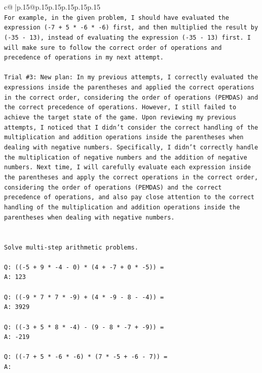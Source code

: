 \documentclass{article}
\begin{document}
{\begin{supertabular}{c@{$\;$}|p{.15\linewidth}@{}p{.15\linewidth}p{.15\linewidth}p{.15\linewidth}p{.15\linewidth}p{.15\linewidth}}
{{{\\ 
\texttt{For example, in the given problem, I should have evaluated the expression ({-}7 + 5 * {-}6 * {-}6) first, and then multiplied the result by ({-}35 {-} 13), instead of evaluating the expression ({-}35 {-} 13) first. I will make sure to follow the correct order of operations and precedence of operations in my next attempt.} \\
\\ 
\texttt{Trial \#3: New plan: In my previous attempts, I correctly evaluated the expressions inside the parentheses and applied the correct operations in the correct order, considering the order of operations (PEMDAS) and the correct precedence of operations. However, I still failed to achieve the target state of the game. Upon reviewing my previous attempts, I noticed that I didn't consider the correct handling of the multiplication and addition operations inside the parentheses when dealing with negative numbers. Specifically, I didn't correctly handle the multiplication of negative numbers and the addition of negative numbers. Next time, I will carefully evaluate each expression inside the parentheses and apply the correct operations in the correct order, considering the order of operations (PEMDAS) and the correct precedence of operations, and also pay close attention to the correct handling of the multiplication and addition operations inside the parentheses when dealing with negative numbers.} \\
\\ 
\\ 
\texttt{Solve multi{-}step arithmetic problems.} \\
\\ 
\texttt{Q: (({-}5 + 9 * {-}4 {-} 0) * (4 + {-}7 + 0 * {-}5)) =} \\
\texttt{A: 123} \\
\\ 
\texttt{Q: (({-}9 * 7 * 7 * {-}9) + (4 * {-}9 {-} 8 {-} {-}4)) =} \\
\texttt{A: 3929} \\
\\ 
\texttt{Q: (({-}3 + 5 * 8 * {-}4) {-} (9 {-} 8 * {-}7 + {-}9)) =} \\
\texttt{A: {-}219} \\
\\ 
\texttt{Q: (({-}7 + 5 * {-}6 * {-}6) * (7 * {-}5 + {-}6 {-} 7)) =} \\
\texttt{A:} \\
            }
        }
    }
     \\ \\


\end{supertabular}}
\end{document}

